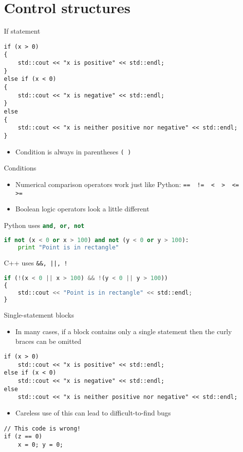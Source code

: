\part{Control structures}
\frame{\partpage}

\begin{frame}[fragile]{If statement}
	\begin{lstlisting}
if (x > 0)
{
    std::cout << "x is positive" << std::endl;
}
else if (x < 0)
{
    std::cout << "x is negative" << std::endl;
}
else
{
    std::cout << "x is neither positive nor negative" << std::endl;
}
	\end{lstlisting}
    \pause
    \begin{itemize}
        \item Condition is always in parentheses \lstinline{( )}
    \end{itemize}
\end{frame}

\begin{frame}[fragile]{Conditions}
    \begin{itemize}
        \item Numerical comparison operators work just like Python:
        \lstinline{==  !=  <  >  <=  >=}
        \item Boolean logic operators look a little different
    \end{itemize}
    Python uses \lstinline[language=Python]{and, or, not}
    \begin{lstlisting}[language=Python]
if not (x < 0 or x > 100) and not (y < 0 or y > 100):
    print "Point is in rectangle"
    \end{lstlisting}
    C++ uses \lstinline{&&, ||, !}
    \begin{lstlisting}[language=Python]
if (!(x < 0 || x > 100) && !(y < 0 || y > 100))
{
    std::cout << "Point is in rectangle" << std::endl;
}
    \end{lstlisting}
\end{frame}

\begin{frame}[fragile]{Single-statement blocks}
    \begin{itemize}
        \item In many cases, if a block contains only a single statement then the curly braces can be omitted
    \end{itemize}
    \begin{lstlisting}
if (x > 0)
    std::cout << "x is positive" << std::endl;
else if (x < 0)
    std::cout << "x is negative" << std::endl;
else
    std::cout << "x is neither positive nor negative" << std::endl;
    \end{lstlisting}
    \begin{itemize}
        \item Careless use of this can lead to difficult-to-find bugs
    \end{itemize}
    \begin{lstlisting}
// This code is wrong!
if (z == 0)
    x = 0; y = 0;
    \end{lstlisting}
\end{frame}

